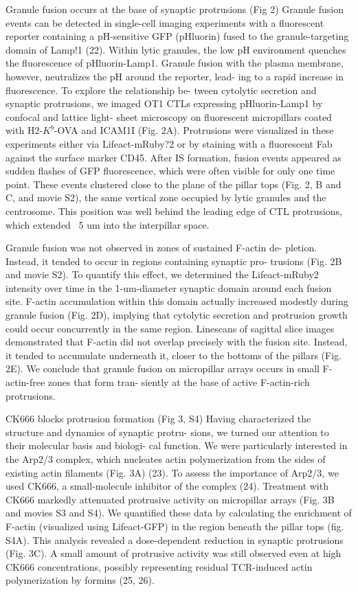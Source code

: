 Granule fusion occurs at the base of synaptic protrusions (Fig 2)
Granule fusion events can be detected in single-cell imaging experiments with a fluorescent reporter containing a pH-sensitive GFP (pHluorin) fused to the granule-targeting domain of
Lamp!1 (22). Within lytic granules, the low pH environment quenches
the fluorescence of pHluorin-Lamp1. Granule fusion with the plasma
membrane, however, neutralizes the pH around the reporter, lead-
ing to a rapid increase in fluorescence. To explore the relationship be-
tween cytolytic secretion and synaptic protrusions, we imaged OT1
CTLs expressing pHluorin-Lamp1 by confocal and lattice  light- sheet
microscopy on fluorescent micropillars coated with H2-$K^{b}$-OVA and
ICAM1I (Fig. 2A). Protrusions were visualized in these experiments
either via Lifeact-mRuby?2 or by staining with a fluorescent Fab against
the surface marker CD45. After IS formation, fusion events appeared
as sudden flashes of GFP fluorescence, which were often visible for
only one time point. These events clustered close to the plane of the
pillar tops (Fig. 2, B and C, and movie S2), the same vertical zone
occupied by lytic granules and the centrosome. This position was well
behind the leading edge of CTL protrusions, which extended ~5 um
into the interpillar space.

Granule fusion was not observed in zones of sustained F-actin de-
pletion. Instead, it tended to occur in regions containing synaptic pro-
trusions (Fig. 2B and movie S2). To quantify this effect, we determined
the Lifeact-mRuby2 intensity over time in the 1-um-diameter synaptic
domain around each fusion site. F-actin accumulation within this
domain actually increased modestly during granule fusion (Fig. 2D),
implying that cytolytic secretion and protrusion growth could occur
concurrently in the same region. Linescans of sagittal slice images
demonstrated that F-actin did not overlap precisely with the fusion
site. Instead, it tended to accumulate underneath it, closer to the
bottoms of the pillars (Fig. 2E). We conclude that granule fusion on
micropillar arrays occurs in small F-actin-free zones that form tran-
siently at the base of active F-actin-rich protrusions.



CK666 blocks protrusion formation (Fig 3, S4)
Having characterized the structure and dynamics of synaptic protru-
sions, we turned our attention to their molecular basis and biologi-
cal function. We were particularly interested in the Arp2/3 complex,
which nucleates actin polymerization from the sides of existing
actin filaments (Fig. 3A) (23). To assess the importance of Arp2/3,
we used CK666, a small-molecule inhibitor of the complex (24).
Treatment with CK666 markedly attenuated protrusive activity on
micropillar arrays (Fig. 3B and movies S3 and S4). We quantified
these data by calculating the enrichment of F-actin (visualized using
Lifeact-GFP) in the region beneath the pillar tops (fig. S4A). This
analysis revealed a dose-dependent reduction in synaptic protrusions
(Fig. 3C). A small amount of protrusive activity was still observed
even at high CK666 concentrations, possibly representing residual
TCR-induced actin polymerization by formins (25, 26).

